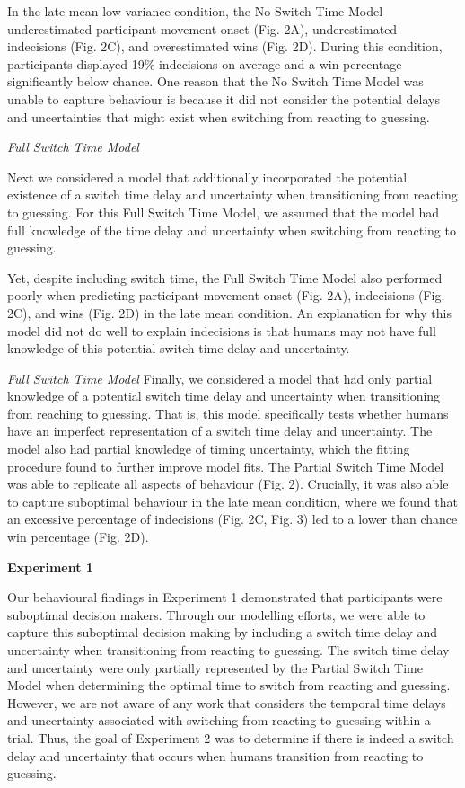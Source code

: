 \documentclass[12pt,letterpaper]{article}
\begin{document}
In the late mean low variance condition, the No Switch Time Model underestimated participant movement onset (Fig. 2A), underestimated indecisions (Fig. 2C), and overestimated wins (Fig. 2D). During this condition, participants displayed 19\% indecisions on average and a win percentage significantly below chance. One reason that the No Switch Time Model was unable to capture behaviour is because it did not consider the potential delays and uncertainties that might exist when switching from reacting to guessing.

\noindent\emph{\textcolor{mydarkblue}{{Full Switch Time Model}}}

Next we considered a model that additionally incorporated the potential existence of a switch time delay and uncertainty when transitioning from reacting to guessing. For this Full Switch Time Model, we assumed that the model had full knowledge of the time delay and uncertainty when switching from reacting to guessing.

Yet, despite including switch time, the Full Switch Time Model also performed poorly when predicting participant movement onset (Fig. 2A), indecisions (Fig. 2C), and wins (Fig. 2D) in the late mean condition. An explanation for why this model did not do well to explain indecisions is that humans may not have full knowledge of this potential switch time delay and uncertainty.

\noindent\emph{\textcolor{mydarkblue}{{Full Switch Time Model}}}
Finally, we considered a model that had only partial knowledge of a potential switch time delay and uncertainty when transitioning from reaching to guessing. That is, this model specifically tests whether humans have an imperfect representation of a switch time delay and uncertainty. The model also had partial knowledge of timing uncertainty, which the fitting procedure found to further improve model fits. The Partial Switch Time Model was able to replicate all aspects of behaviour (Fig. 2). Crucially, it was also able to capture suboptimal behaviour in the late mean condition, where we found that an excessive percentage of indecisions (Fig. 2C, Fig. 3) led to a lower than chance win percentage (Fig. 2D).

\textbf{\textcolor{mydarkblue}{{Experiment 1}}}
\vspace{2mm}

Our behavioural findings in Experiment 1 demonstrated that participants were suboptimal decision makers. Through our modelling efforts, we were able to capture this suboptimal decision making by including a switch time delay and uncertainty when transitioning from reacting to guessing. The switch time delay and uncertainty were only partially represented by the Partial Switch Time Model when determining the optimal time to switch from reacting and guessing. However, we are not aware of any work that considers the temporal time delays and uncertainty associated with switching from reacting to guessing within a trial. Thus, the goal of Experiment 2 was to determine if there is indeed a switch delay and uncertainty that occurs when humans transition from reacting to guessing.
\end{document}
